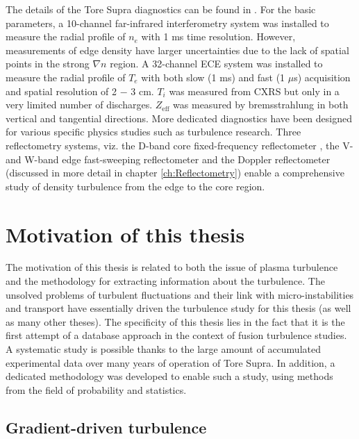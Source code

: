 The details of the Tore Supra diagnostics can be found in \cite{Gil_2009_FST}. For the basic parameters, a 10-channel far-infrared interferometry system was installed to measure the radial profile of $n_e$ with 1 ms time resolution. However, measurements of edge density have larger uncertainties due to the lack of spatial points in the strong $\nabla n$ region. A 32-channel ECE system \cite{Segui_2005_RSI} was installed to measure the radial profile of $T_e$ with both slow (1 ms) and fast (1 $\mu$s) acquisition and spatial resolution of 2 $-$ 3 cm. $T_i$ was measured from CXRS but only in a very limited number of discharges. $Z_\mathrm{eff}$ was measured by bremsstrahlung in both vertical and tangential directions. More dedicated diagnostics have been designed for various specific physics studies such as turbulence research. Three reflectometry systems, viz. the D-band core fixed-frequency reflectometer \cite{Sabot_2006_NF}, the V- and W-band edge fast-sweeping reflectometer \cite{Clairet_2010_RSI} and the Doppler reflectometer \cite{Hennequin_2006_NF} (discussed in more detail in chapter \ref{ch:Reflectometry}) enable a comprehensive study of density turbulence from the edge to the core region.


\section{Motivation of this thesis} \label{sec:motivation_thesis}


The motivation of this thesis is related to both the issue of plasma turbulence and the methodology for extracting information about the turbulence. The unsolved problems of turbulent fluctuations and their link with micro-instabilities and transport have essentially driven the turbulence study for this thesis (as well as many other theses). The specificity of this thesis lies in the fact that it is the first attempt of a database approach in the context of fusion turbulence studies. A systematic study is possible thanks to the large amount of accumulated experimental data over many years of operation of Tore Supra. In addition, a dedicated methodology was developed to enable such a study, using methods from the field of probability and statistics.



\subsection{Gradient-driven turbulence}

